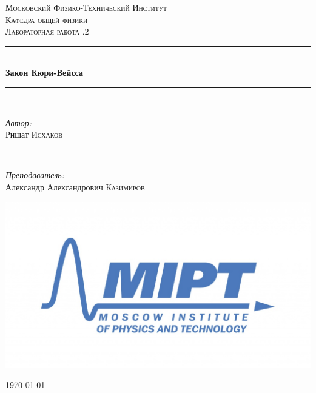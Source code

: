 \documentclass[a4paper, 12pt]{article}
\newenvironment{bottompar}{\par\vspace*{\fill}}{\clearpage}
\begin{document}
\begin{titlepage}

\newcommand{\HRule}{\rule{\linewidth}{0.5mm}} %

\center %
 

\textsc{\LARGE Московский Физико-Технический Институт}\\[1,5cm] %
\textsc{\Large Кафедра общей физики}\\[0.5cm] %
\textsc{\large Лабораторная работа .2}\\[0.5cm] %


\HRule
\\[0.4cm]
{ \huge \bfseries Закон Кюри-Вейсса}
\\[0.2cm] %
\HRule
\\[1.5cm]


 

\begin{minipage}{0.4\textwidth}
	\begin{flushleft} \large
		\emph{Автор:}\\
		Ришат \textsc{Исхаков} %
	\end{flushleft}
\end{minipage}
~
\begin{minipage}{0.4\textwidth}
	\begin{flushright} \large
		\emph{Преподаватель:} \\
		Александр Александрович \textsc{Казимиров} %
	\end{flushright}
\end{minipage}

\begin{bottompar}
	\begin{center}
		\includegraphics[width = 80 mm]{logo.jpg}
	\end{center}
	{\large \today}


\end{bottompar}
\end{titlepage}
\end{document}
